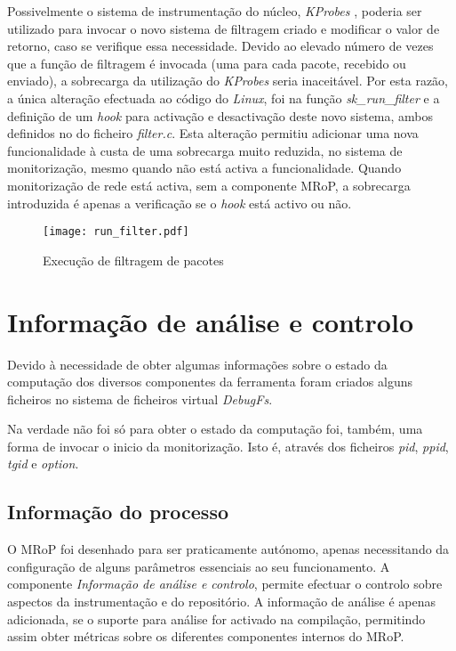 Possivelmente o sistema de instrumentação do núcleo, \textit{KProbes} , poderia ser utilizado para invocar o novo sistema de filtragem criado e modificar o valor de retorno, caso se verifique essa necessidade.
Devido ao elevado número de vezes que a função de filtragem é invocada (uma para cada pacote, recebido ou enviado), a sobrecarga da utilização do \textit{KProbes} seria inaceitável.
Por esta razão, a única alteração efectuada ao código do \textit{Linux}, foi na função \textit{sk\_run\_filter} e a definição de um \textit{hook} para activação e desactivação deste novo sistema, ambos definidos no do ficheiro \textit{filter.c}.
Esta alteração permitiu adicionar uma nova funcionalidade à custa de uma sobrecarga muito reduzida, no sistema de monitorização, mesmo quando não está activa a funcionalidade.
Quando monitorização de rede está activa, sem a componente MRoP, a sobrecarga introduzida é apenas a verificação se o \textit{hook} está activo ou não.


\begin{figure}[ht]
\centering
\texttt{[image: run\_filter.pdf]}
\caption{Execução de filtragem de pacotes}
\label{fig:run_filter}
\end{figure}

\section{Informação de análise e controlo}

Devido à necessidade de obter algumas informações sobre o estado da computação dos diversos componentes da ferramenta foram criados alguns ficheiros no
sistema de ficheiros virtual \textit{DebugFs}.

Na verdade não foi só para obter o estado da computação foi, também, uma forma de invocar o inicio da monitorização.
Isto é, através dos ficheiros \textit{pid}, \textit{ppid}, \textit{tgid} e \textit{option}. 

\subsection{Informação do processo}


O MRoP foi desenhado para ser praticamente autónomo, apenas necessitando da configuração de alguns parâmetros essenciais ao seu funcionamento.
A componente \textit{Informação de análise e controlo}, permite efectuar o controlo sobre aspectos da instrumentação e do repositório.
A informação de análise é apenas adicionada, se o suporte para análise for activado na compilação, permitindo assim obter métricas sobre os diferentes componentes internos do MRoP.

